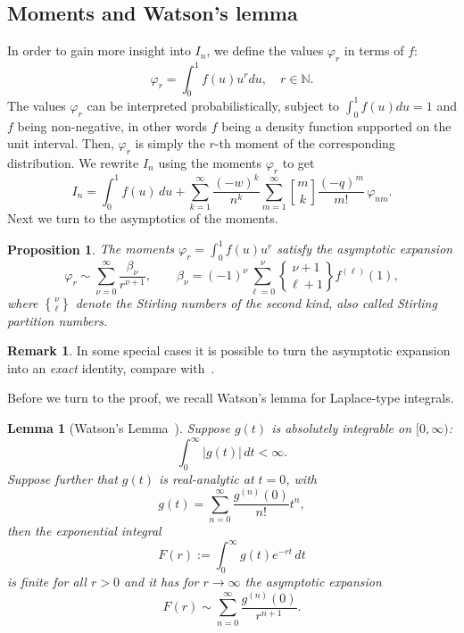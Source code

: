\documentclass[10pt,reqno,a4paper]{amsart}%
\newtheorem{lem}[theorem]{Lemma}
\newtheorem{prop}{Proposition}
\theoremstyle{definition}
\newtheorem{remark}{Remark}
\begin{document}
\subsection{Moments and Watson's lemma}

In order to gain more insight into $I_{n}$, we define the values $\varphi_{r}$
in terms of $f$:
\[
\varphi_{r}=\int_{0}^{1}f(u)u^{r}du,\quad r\in\mathbb{N}.
\]
The values $\varphi_{r}$ can be interpreted probabilistically, subject to
$\int_{0}^{1}f(u)du=1$ and $f$ being non-negative, in other words $f$ being a
density function supported on the unit interval. Then, $\varphi_{r}$ is simply
the $r$-th moment of the corresponding distribution.
%
We rewrite $I_{n}$ using the moments $\varphi_{r}$ to get
\begin{equation}
I_{n}=\int_{0}^{1}f(u)\,du+\sum_{k=1}^{\infty}\frac{(-w)^{k}}{n^{k}}%
\sum_{m=1}^{\infty}%
\genfrac{[}{]}{0pt}{}{m}{k}%
\frac{(-q)^{m}}{m!}\,\varphi_{nm}. \label{eq:Mom}%
\end{equation}
Next we turn to the asymptotics of the moments.

\begin{prop}
\label{Prop:asympMom} The moments $\varphi_{r}=\int_{0}^{1}f(u)u^{r}$ satisfy
the asymptotic expansion
\[
\varphi_{r}\sim\sum_{\nu=0}^{\infty}\frac{\beta_{\nu}}{r^{\nu+1}},\qquad
\beta_{\nu}=(-1)^{\nu}\sum_{\ell=0}^{\nu}%
\genfrac{\{}{\}}{0pt}{}{\nu+1}{\ell+1}%
f^{(\ell)}(1),
\]
where $%
\genfrac{\{}{\}}{0pt}{}{\nu}{\ell}%
$ denote the Stirling numbers of the second kind, also called Stirling
partition numbers.
\end{prop}

\begin{remark}
In some special cases it is possible to turn the asymptotic expansion into an
\emph{exact} identity, compare with~\cite{HKLL2020}.
\end{remark}

Before we turn to the proof, we recall Watson's lemma for Laplace-type integrals.

\begin{lem}
[Watson's Lemma~\cite{Watson}]Suppose $g(t)$ is absolutely integrable on
$[0,\infty)$:
\[
\int_{0}^{\infty}|g(t)|\,dt<\infty.
\]
Suppose further that $g(t)$ is real-analytic at $t=0$, with
\[
g(t)=\sum_{n=0}^{\infty}\frac{g^{(n)}(0)}{n!}t^{n},
\]
then the exponential integral
\[
F(r):=\int_{0}^{\infty}g(t)e^{-rt}\,dt
\]
is finite for all $r>0$ and it has for $r\rightarrow\infty$ the asymptotic
expansion
\begin{equation}
F(r)\sim\sum_{n=0}^{\infty}\frac{g^{(n)}(0)}{r^{n+1}}.
\end{equation}

\end{lem}
\end{document}
